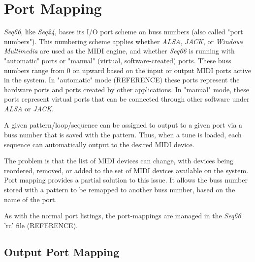 %
%
%

\section{Port Mapping}
\label{sec:port_mapping}

   \textsl{Seq66}, like \textsl{Seq24}, bases its I/O port scheme on buss
   numbers (also called "port numbers").  This numbering scheme applies whether
   \textsl{ALSA}, \textsl{JACK}, or \textsl{Windows Multimedia}
   are used as the MIDI engine, and whether \textsl{Seq66} is running with
   "automatic" ports or "manual" (virtual, software-created) ports.
   These buss numbers range from 0 on upward
   based on the input or output MIDI ports active in the system.
   In "automatic" mode
   (REFERENCE) these ports represent the hardware ports and ports created by
   other applications.  In "manual" mode, these ports represent virtual ports
   that can be connected through other software under \textsl{ALSA} or
   \textsl{JACK}.

   A given pattern/loop/sequence can be assigned to output to a given port via
   a buss number that is saved with the pattern.  Thus, when a tune is loaded,
   each sequence can automatically output to the desired MIDI device.

   The problem is that the list of MIDI devices can change, with devices being
   reordered, removed, or added to the set of MIDI devices available on the
   system.  Port mapping provides a partial solution to this issue.  It allows
   the buss number stored with a pattern to be remapped to another buss number,
   based on the name of the port.

   As with the normal port listings, the port-mappings are managed in the
   \textsl{Seq66} 'rc' file (REFERENCE).

\subsection{Output Port Mapping}
\label{subsec:output_port_mapping}

